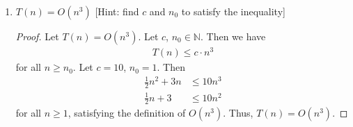 \documentclass{article}
\begin{document}
\begin{enumerate}[label=(\alph*).]
\begin{proof}
            We have found sufficient $c_1$, $c_2$, $n_0$ satisfying the definition of $\Theta(n^2)$. Thus,
            $T(n) = \Theta(n^2)$.
        \end{proof}
    \item $T(n) = O(n^3)$ [Hint: find $c$ and $n_0$ to satisfy the inequality]
        \begin{proof}
            Let $T(n) = O(n^3)$. Let $c$, $n_0 \in \mathbb{N}$. Then we have
            \begin{align*}
                T(n) \le c \cdot n^3
            \end{align*}
            for all $n \ge n_0$. Let $c = 10$, $n_0 = 1$. Then
            \begin{align*}
                \frac{1}{2}n^2+3n &\le 10n^3\\
                \frac{1}{2}n + 3 &\le 10n^2
            \end{align*}
            for all $n \ge 1$, satisfying the definition of $O(n^3)$. Thus, $T(n) = O(n^3)$.
        \end{proof}
    \end{enumerate}
\end{document}
